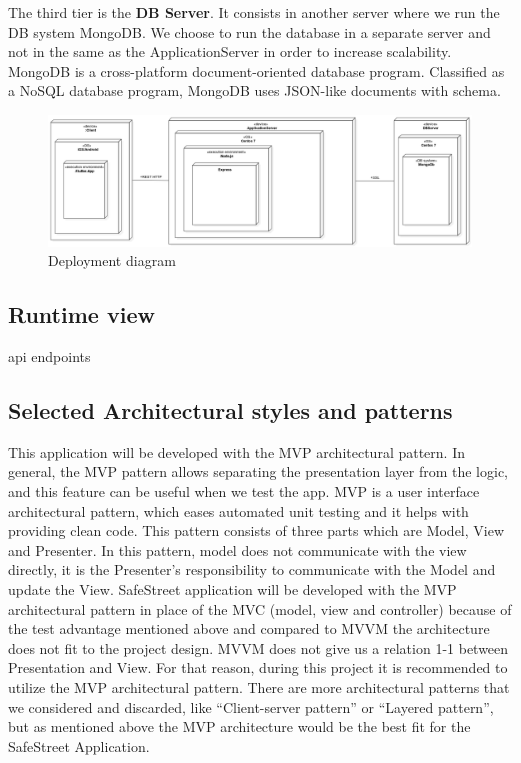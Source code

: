 The third tier is the \textbf{DB Server}. It consists in another server where we run the DB system MongoDB. We choose to run the database in a separate server and not in the same as the ApplicationServer in order to increase scalability. MongoDB is a cross-platform document-oriented database program. Classified as a NoSQL database program, MongoDB uses JSON-like documents with schema.



\begin{figure}
\centering
\includegraphics[width=\textwidth]{Images/DeploymentDiagram1.png}
\caption{\label{fig:deploy} Deployment diagram}
\end{figure}



\subsection{Runtime view}


api endpoints

\API\login
\API\violation
\API\ticket



\subsection{Selected Architectural styles and patterns}




This application will be developed with the MVP architectural pattern. In general, the MVP pattern allows separating the presentation layer from the logic, and this feature can be useful when we test the app. MVP is a user interface architectural pattern, which eases automated unit testing and it helps with providing clean code. This pattern consists of three parts which are Model, View and Presenter. In this pattern, model does not communicate with the view directly, it is the Presenter’s responsibility to communicate with the Model and update the View. SafeStreet application will be developed with the MVP architectural pattern in place of the MVC (model, view and controller) because of the test advantage mentioned above and compared to MVVM the architecture does not ﬁt to the project design. MVVM does not give us a relation 1-1 between Presentation and View. For that reason, during this project it is recommended to utilize the MVP architectural pattern. There are more architectural patterns that we considered and discarded, like “Client-server pattern” or “Layered pattern”, but as mentioned above the MVP architecture would be the best ﬁt for the SafeStreet Application.


